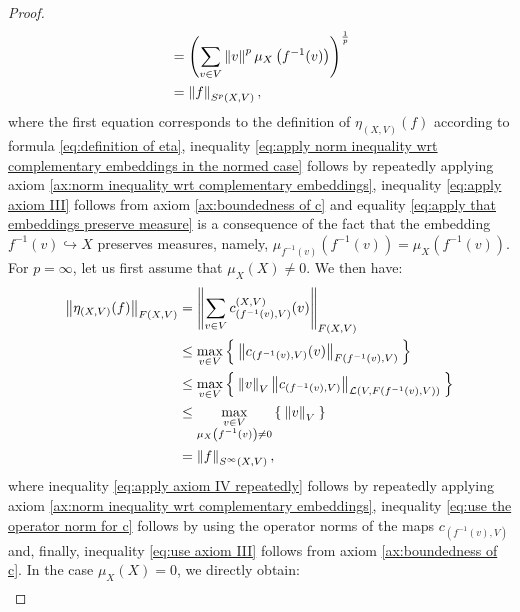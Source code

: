 \documentclass{amsart}
\theoremstyle{definition}
\theoremstyle{plain}
\newcommand{\norm}[1]{\left\lVert #1\right\rVert} %
\begin{document}
\begin{proof}
\begin{align}
                &= \left( \sum_{v \in V} \norm{v}^p \mu_X\left( f^{-1}(v) \right) \right)^{\frac{1}{p}} \label{eq:apply that embeddings preserve measure} \\
                &= \norm{f}_{S^p(X,V)}, \notag
            \end{align}
            where the first equation corresponds to the definition of $\eta_{(X,V)}(f)$ according to formula \eqref{eq:definition of eta}, inequality \eqref{eq:apply norm inequality wrt complementary embeddings in the normed case} follows by repeatedly applying axiom \ref{ax:norm inequality wrt complementary embeddings}, inequality \eqref{eq:apply axiom III} follows from axiom \ref{ax:boundedness of c} and equality \eqref{eq:apply that embeddings preserve measure} is a consequence of the fact that the embedding $f^{-1}(v) \hookrightarrow X$ preserves measures, namely, $\mu_{f^{-1}(v)}\left( f^{-1}(v) \right) = \mu_X\left( f^{-1}(v) \right)$. \\
            For $p = \infty$, let us first assume that $\mu_X(X) \neq 0$.
            We then have:
            \begin{align}
                \norm{\eta_{(X,V)}(f)}_{F(X,V)} &= \norm{\sum_{v \in V} c_{\left( f^{-1}(v),V \right)}^{(X,V)}(v)}_{F(X,V)} \notag \\
                &\leq \max_{v \in V}\Set{\norm{c_{\left( f^{-1}(v),V \right)}(v)}_{F\left( f^{-1}(v),V \right)}} \label{eq:apply axiom IV repeatedly} \\
                &\leq \max_{v \in V}\Set{\norm{v}_V \norm{c_{\left( f^{-1}(v),V \right)}}_{\mathcal{L}\left( V,F\left( f^{-1}(v),V \right) \right)}} \label{eq:use the operator norm for c} \\
                &\leq \max_{\substack{v \in V \\ \mu_X\left( f^{-1}(v) \right) \neq 0}} \Set{\norm{v}_V} \label{eq:use axiom III} \\
                &= \norm{f}_{S^\infty(X,V)}, \notag
            \end{align}
            where inequality \eqref{eq:apply axiom IV repeatedly} follows by repeatedly applying axiom \ref{ax:norm inequality wrt complementary embeddings}, inequality \eqref{eq:use the operator norm for c} follows by using the operator norms of the maps $c_{\left( f^{-1}(v),V \right)}$ and, finally, inequality \eqref{eq:use axiom III} follows from axiom \ref{ax:boundedness of c}.
            In the case $\mu_X(X) = 0$, we directly obtain:
            \begin{align}

\end{align}
\end{proof}
\end{document}
